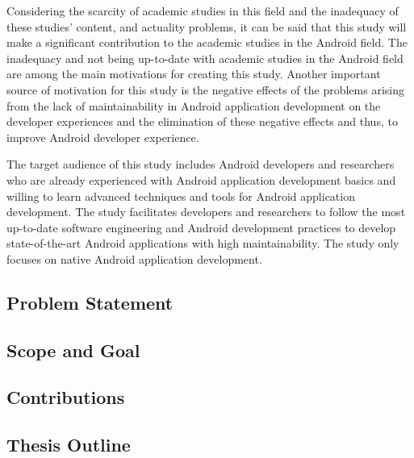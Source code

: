 Considering the scarcity of academic studies in this field and the inadequacy of these studies' content, and actuality problems, it can be said that this study will make a significant contribution to the academic studies in the Android field. The inadequacy and not being up-to-date with academic studies in the Android field are among the main motivations for creating this study. Another important source of motivation for this study is the negative effects of the problems arising from the lack of maintainability in Android application development on the developer experiences and the elimination of these negative effects and thus, to improve  Android developer experience.

The target audience of this study includes Android developers and researchers who are already experienced with Android application development basics and willing to learn advanced techniques and tools for Android application development. The study facilitates developers and researchers to follow the most up-to-date software engineering and Android development practices to develop state-of-the-art Android applications with high maintainability. The study only focuses on native Android application development.

\subsection{Problem Statement}


\subsection{Scope and Goal}


\subsection{Contributions}


\subsection{Thesis Outline}
